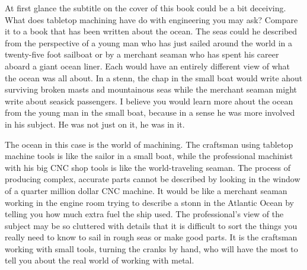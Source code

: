 
\secdown

\secdown


At first glance the subtitle on the cover of this book could be a bit deceiving.
What does tabletop machining have do with engineering you may ask? Compare it to
a book that has been written about the ocean. The seas could he described from
the perspective of a young man who has just sailed around the world in a
twenty-five foot sailboat or by a merchant seaman who has spent his career
aboard a giant ocean liner. Each would have an entirely different view of what
the ocean was all about. In a stenn, the chap in the small boat would write
ahout surviving broken masts and mountainous seas while the merchant seaman
might write about seasick passengers. I believe you would learn more ahout the
ocean from the young man in the small boat, because in a sense he was more
involved in his subject. He was not just on it, he was in it.


The ocean in this case is the world of machining. The craftsman using tabletop
machine tools is like the sailor in a small boat, while the professional
machinist with his big CNC shop tools is like the world-traveling seaman. The
process of producing complex, accurate parts cannot be described by looking in
the window of a quarter million dollar CNC machine.
It would be like a merchant seaman working in the engine room trying to describe
a stonn in the Atlantic Ocean by telling you how much extra fuel the ship used.
The professional's view of the subject may be so cluttered with details that it
is difficult to sort the things you really need to know to sail in rough seas or
make good parts. It is the craftsman working with small tools, turning the
cranks by hand, who will have the most to tell you about the real world of
working with metal.


